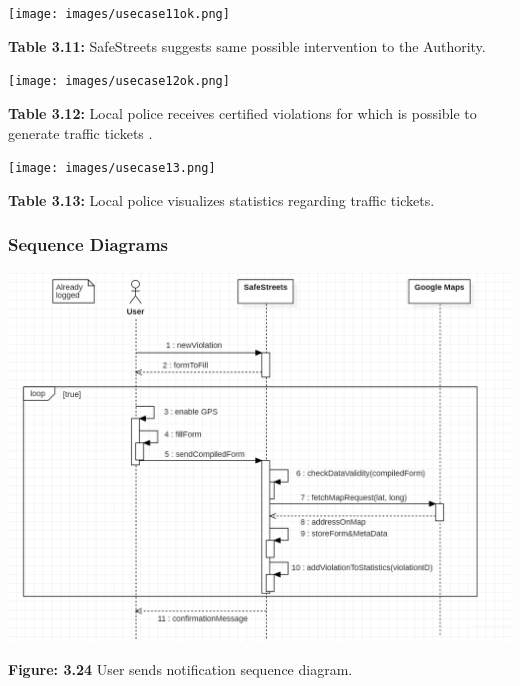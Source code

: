 \documentclass[12pt]{article}
\begin{document}
\begin{center}
\texttt{[image: images/usecase11ok.png]}                 

\textbf{Table 3.11:} SafeStreets suggests same possible intervention to the Authority.
\end{center}

\newpage
 \texttt{[image: images/usecase12ok.png]}                  
		 
		  \textbf{Table 3.12:} Local police receives certified violations for  which is possible to generate traffic tickets .

\newpage
 \texttt{[image: images/usecase13.png]}                  
		 
		  \textbf{Table 3.13:} Local police visualizes statistics regarding traffic tickets.
		  
\vspace{5mm}
\subsubsection{Sequence Diagrams}
		  \vspace{5mm}
		 
		 \includegraphics[scale=0.55]{Sequencediagrams/userSendNotification.png}                  
		 
		  \textbf{Figure: 3.24} User sends notification sequence diagram.

\newpage
\end{document}
